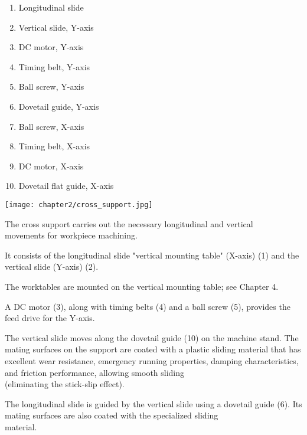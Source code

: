 \begin{minipage}{0.5\textwidth}
    \begin{enumerate}[itemsep=1pt,parsep=0pt]
        \item Longitudinal slide
        \item Vertical slide, Y-axis
        \item DC motor, Y-axis
        \item Timing belt, Y-axis
        \item Ball screw, Y-axis
        \item Dovetail guide, Y-axis
        \item Ball screw, X-axis
        \item Timing belt, X-axis
        \item DC motor, X-axis
        \item Dovetail flat guide, X-axis
    \end{enumerate}
\end{minipage}%
\begin{minipage}{0.5\textwidth}
    \centering
    \texttt{[image: chapter2/cross\_support.jpg]}
    \label{fig:cross_support}
\end{minipage}

\vspace{1cm}

The cross support carries out the necessary longitudinal and vertical\\ movements for workpiece machining.

It consists of the longitudinal slide "vertical mounting table" (X-axis) (1) and the vertical slide (Y-axis) (2).

The worktables are mounted on the vertical mounting table; see Chapter 4.

A DC motor (3), along with timing belts (4) and a ball screw (5), provides the feed drive for the Y-axis.

The vertical slide moves along the dovetail guide (10) on the machine stand. The mating surfaces on the support are coated with a plastic sliding material that has excellent wear resistance, emergency running properties, damping characteristics, and friction performance, allowing smooth sliding \\(eliminating the stick-slip effect).

The longitudinal slide is guided by the vertical slide using a dovetail guide (6). Its mating surfaces are also coated with the specialized sliding \\material.

